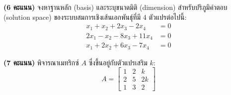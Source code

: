 \documentclass[12pt, a4paper]{exam}
\begin{document}
\begin{questions}
\question \textbf{(6 คะแนน)} จงหาฐานหลัก (basis) และระบุขนาดมิติ (dimension) สำหรับปริภูมิคำตอบ (solution space) ของระบบสมการเชิงเส้นเอกพันธุ์ที่มี 4 ตัวแปรต่อไปนี้:
\[
\begin{aligned}
x_1 + x_2 + 2x_3 - 2x_4 &= 0 \\
2x_1 - x_2 - 8x_3 + 11x_4 &= 0 \\
x_1 + 2x_2 + 6x_3 - 7x_4 &= 0
\end{aligned}
\]
\newpage

\question \textbf{(7 คะแนน)} พิจารณาเมทริกซ์ $A$ ซึ่งขึ้นอยู่กับตัวแปรเสริม $k$:
\[
A = \begin{bmatrix} 1 & 2 & k \\ 2 & 5 & 2k \\ 1 & 3 & 2 \end{bmatrix}
\]
\newpage


\end{questions}
\end{document}
